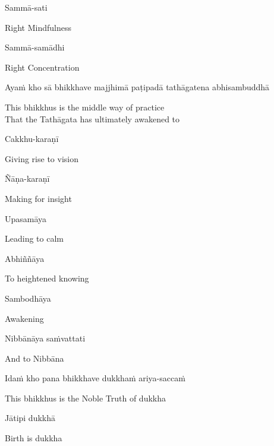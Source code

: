 Sammā-sati

\begin{cprenglish}
  Right Mindfulness
\end{cprenglish}

Sammā-samādhi

\begin{cprenglish}
  Right Concentration
\end{cprenglish}

Ayaṁ kho sā bhikkhave majjhimā paṭipadā tathāgatena abhisambuddhā

\begin{cprenglish}
  This bhikkhus is the middle way of practice\\
  That the Tathāgata has ultimately awakened to
\end{cprenglish}

Cakkhu-karaṇī

\begin{cprenglish}
  Giving rise to vision
\end{cprenglish}

Ñāṇa-karaṇī

\begin{cprenglish}
  Making for insight
\end{cprenglish}

Upasamāya

\begin{cprenglish}
  Leading to calm
\end{cprenglish}

Abhiññāya

\begin{cprenglish}
  To heightened knowing
\end{cprenglish}

Sambodhāya

\begin{cprenglish}
  Awakening
\end{cprenglish}

Nibbānāya saṁvattati

\begin{cprenglish}
  And to Nibbāna
\end{cprenglish}

Idaṁ kho pana bhikkhave dukkhaṁ ariya-saccaṁ

\begin{cprenglish}
  This bhikkhus is the Noble Truth of dukkha
\end{cprenglish}

Jātipi dukkhā

\begin{cprenglish}
  Birth is dukkha
\end{cprenglish}

